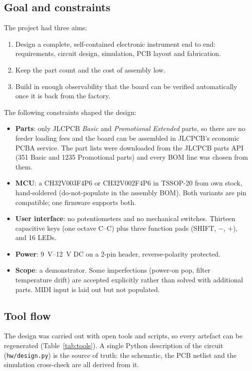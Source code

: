 \documentclass[11pt,a4paper]{article}
\newcommand{\file}[1]{\texttt{#1}}
\begin{document}
\subsection{Goal and constraints}
The project had three aims:
\begin{enumerate}
  \item Design a complete, self-contained electronic instrument end to end: requirements, circuit design,
    simulation, PCB layout and fabrication.
  \item Keep the part count and the cost of assembly low.
  \item Build in enough observability that the board can be verified automatically once it is back from
    the factory.
\end{enumerate}
The following constraints shaped the design:
\begin{itemize}
  \item \textbf{Parts}: only JLCPCB \emph{Basic} and \emph{Promotional Extended} parts, so there are no
    feeder loading fees and the board can be assembled in JLCPCB's economic PCBA service. The part lists
    were downloaded from the JLCPCB parts API (351 Basic and 1235 Promotional parts) and every BOM line was
    chosen from them.
  \item \textbf{MCU}: a CH32V003F4P6 or CH32V002F4P6 in TSSOP-20 from own stock, hand-soldered
    (do-not-populate in the assembly BOM). Both variants are pin compatible; one firmware supports both.
  \item \textbf{User interface}: no potentiometers and no mechanical switches. Thirteen capacitive keys
    (one octave C--C) plus three function pads (SHIFT, $-$, $+$), and 16 LEDs.
  \item \textbf{Power}: \SIrange{9}{12}{V} DC on a 2-pin header, reverse-polarity protected.
  \item \textbf{Scope}: a demonstrator. Some imperfections (power-on pop, filter temperature drift) are
    accepted explicitly rather than solved with additional parts. MIDI input is laid out but not populated.
\end{itemize}

\subsection{Tool flow}
The design was carried out with open tools and scripts, so every artefact can be regenerated
(Table~\ref{tab:tools}). A single Python description of the circuit (\file{hw/design.py}) is the source of
truth: the schematic, the PCB netlist and the simulation cross-check are all derived from it.
\end{document}
